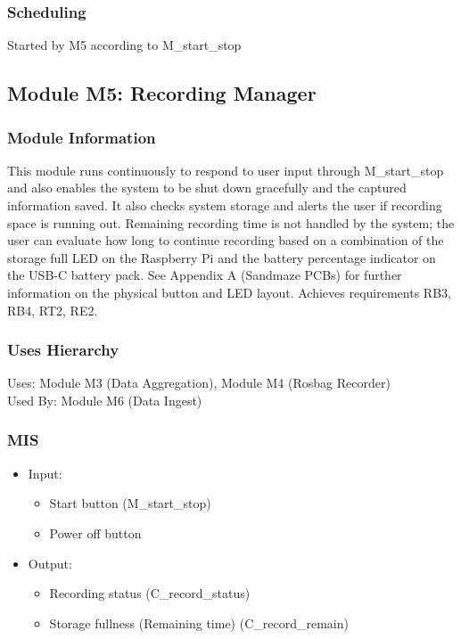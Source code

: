 \documentclass[11pt]{article}
\begin{document}
			\subsubsection{Scheduling}
				Started by M5 according to M\_start\_stop
        \subsection{Module M5: Recording Manager}
			\subsubsection{Module Information}
				This module runs continuously to respond to user input through M\_start\_stop and also enables the system to be shut down gracefully and the captured information saved. It also checks system storage and alerts the user if recording space is running out. Remaining recording time is not handled by the system; the user can evaluate how long to continue recording based on a combination of the storage full LED on the Raspberry Pi and the battery percentage indicator on the USB-C battery pack. See Appendix A (Sandmaze PCBs) for further information on the physical button and LED layout. Achieves requirements RB3, RB4, RT2, RE2.
			\subsubsection{Uses Hierarchy}
				Uses: Module M3 (Data Aggregation), Module M4 (Rosbag Recorder) \\
				Used By: Module M6 (Data Ingest)
			\subsubsection{MIS}
				\begin{itemize}
					\item Input:
						\begin{itemize}
							\item Start button (M\_start\_stop)
							\item Power off button
						\end{itemize}
					\item Output:
						\begin{itemize}
							\item Recording status (C\_record\_status)
                            \item Storage fullness (Remaining time) (C\_record\_remain)
						\end{itemize}
				\end{itemize}
\end{document}
